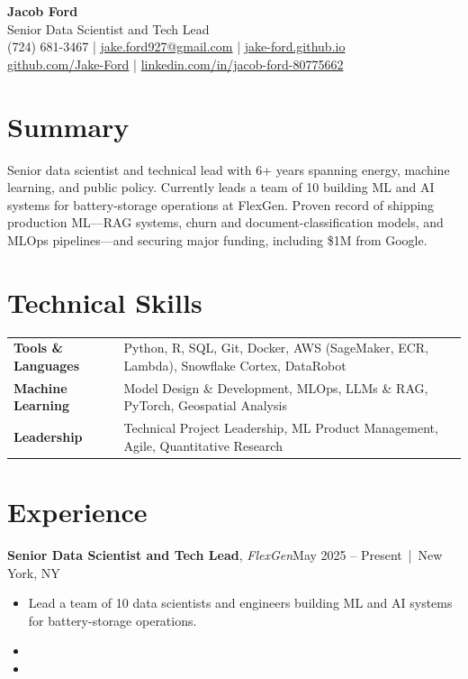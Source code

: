 \documentclass[11pt]{article}
\newcommand{\entry}[4]{%
  \textbf{#1}, \textit{#3}\hfill #2 \,|\, #4\par%
}
\begin{document}
\begin{center}
  {\LARGE\bfseries Jacob Ford}\\[2pt]
  {\large Senior Data Scientist and Tech Lead}\\[4pt]
  (724) 681-3467 \;|\; \href{mailto:jake.ford927@gmail.com}{jake.ford927@gmail.com} \;|\;
  \href{https://jake-ford.github.io}{jake-ford.github.io}\\
  \href{https://github.com/Jake-Ford}{github.com/Jake-Ford} \;|\;
  \href{https://www.linkedin.com/in/jacob-ford-80775662/}{linkedin.com/in/jacob-ford-80775662}
\end{center}

\section{Summary}
Senior data scientist and technical lead with 6+ years spanning energy, machine learning, and public policy. Currently leads a team of 10 building ML and AI systems for battery-storage operations at FlexGen. Proven record of shipping production ML---RAG systems, churn and document-classification models, and MLOps pipelines---and securing major funding, including \$1M from Google.

\section{Technical Skills}
\begin{tabularx}{\textwidth}{@{}l X@{}}
  \textbf{Tools \& Languages} & Python, R, SQL, Git, Docker, AWS (SageMaker, ECR, Lambda), Snowflake Cortex, DataRobot \\
  \textbf{Machine Learning}   & Model Design \& Development, MLOps, LLMs \& RAG, PyTorch, Geospatial Analysis \\
  \textbf{Leadership}         & Technical Project Leadership, ML Product Management, Agile, Quantitative Research \\
\end{tabularx}

\section{Experience}

\entry{Senior Data Scientist and Tech Lead}{May 2025 -- Present}{FlexGen}{New York, NY}
\begin{itemize}
  \item Lead a team of 10 data scientists and engineers building ML and AI systems for battery-storage operations.
  \item %
  \item %
\end{itemize}
\end{document}
